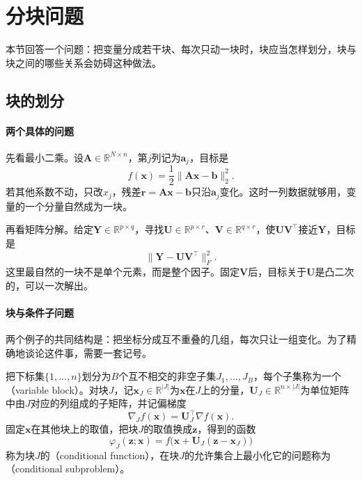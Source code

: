 \section{分块问题}
\label{sec:block-problem}

本节回答一个问题：把变量分成若干块、每次只动一块时，块应当怎样划分，块与块之间的哪些关系会妨碍这种做法。

\subsection{块的划分}
\label{sec:block-partition}

\paragraph{两个具体的问题}
先看最小二乘。设$\bm{A}\in\mathbb{R}^{N\times n}$，第$j$列记为$\bm{a}_j$，目标是
\[
 f(\bm{x})=\frac12\lVert\bm{A}\bm{x}-\bm{b}\rVert_2^2 .
\]
若其他系数不动，只改$x_j$，残差$\bm{r}=\bm{A}\bm{x}-\bm{b}$只沿$\bm{a}_j$变化。这时一列数据就够用，变量的一个分量自然成为一块。

再看矩阵分解。给定$\bm{Y}\in\mathbb{R}^{p\times q}$，寻找$\bm{U}\in\mathbb{R}^{p\times r}$、$\bm{V}\in\mathbb{R}^{q\times r}$，使$\bm{U}\bm{V}^\top$接近$\bm{Y}$，目标是
\[
 \lVert\bm{Y}-\bm{U}\bm{V}^\top\rVert_F^2 .
\]
这里最自然的一块不是单个元素，而是整个因子。固定$\bm{V}$后，目标关于$\bm{U}$是凸二次的，可以一次解出。

\paragraph{块与条件子问题}
两个例子的共同结构是：把坐标分成互不重叠的几组，每次只让一组变化。为了精确地谈论这件事，需要一套记号。

\begin{definition}[变量分块与条件子问题]
\label{def:block-partition}
把下标集$\{1,\ldots,n\}$划分为$B$个互不相交的非空子集$J_1,\ldots,J_B$，每个子集称为一个（variable block）。对块$J$，记$\bm{x}_J\in\mathbb{R}^{\lvert J\rvert}$为$\bm{x}$在$J$上的分量，$\bm{U}_J\in\mathbb{R}^{n\times\lvert J\rvert}$为单位矩阵中由$J$对应的列组成的子矩阵，并记偏梯度
\begin{equation}
 \nabla_Jf(\bm{x})=\bm{U}_J^\top\nabla f(\bm{x}).
 \label{eq:block-partial-gradient}
\end{equation}
固定$\bm{x}$在其他块上的取值，把块$J$的取值换成$\bm{z}$，得到的函数
\begin{equation}
 \varphi_J(\bm{z};\bm{x})=f\bigl(\bm{x}+\bm{U}_J(\bm{z}-\bm{x}_J)\bigr)
 \label{eq:block-conditional}
\end{equation}
称为块$J$的（conditional function），在块$J$的允许集合上最小化它的问题称为（conditional subproblem）。
\end{definition}

